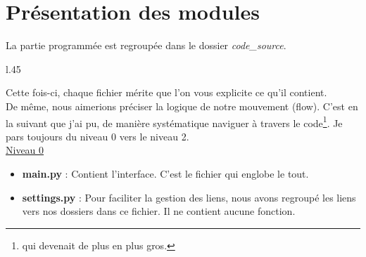 \newpage
\section{Présentation des modules}

La partie programmée est regroupée dans le dossier \emph{code\_source}. \\

 \begin{wrapfigure}{l}{.45\textwidth} %
\end{wrapfigure}

Cette fois-ci, chaque fichier mérite que l'on vous explicite ce qu'il contient. \\

De même, nous aimerions préciser la logique de notre mouvement (flow). C'est en la suivant que j'ai pu, de manière systématique naviguer à travers le code\footnote{qui devenait de plus en plus gros.}. Je pars toujours du niveau 0 vers le niveau 2. \\  

\underline{Niveau 0}
	\begin{itemize}
	\item \textbf{main.py} : Contient l'interface. C'est le fichier qui englobe le tout.
	\item \textbf{settings.py} : Pour faciliter la gestion des liens, nous avons regroupé les liens vers nos dossiers dans ce fichier. Il ne contient aucune fonction.
	\end{itemize}

